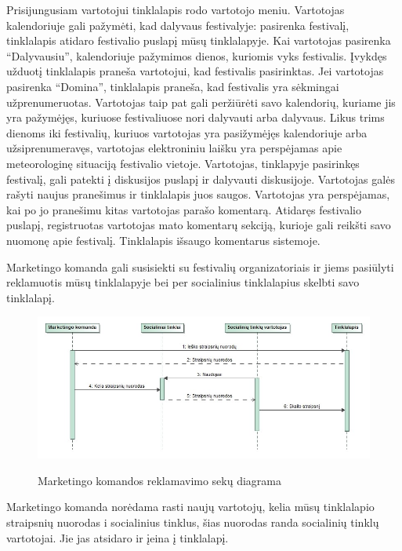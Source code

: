 \documentclass{VUMIFPSkursinis}
\begin{document}
Prisijungusiam vartotojui  tinklalapis rodo vartotojo meniu. Vartotojas kalendoriuje gali pažymėti, kad dalyvaus festivalyje: pasirenka festivalį, tinklalapis atidaro festivalio puslapį mūsų tinklalapyje. Kai vartotojas pasirenka “Dalyvausiu”, kalendoriuje pažymimos dienos, kuriomis vyks festivalis. Įvykdęs užduotį tinklalapis praneša vartotojui, kad festivalis pasirinktas. Jei vartotojas pasirenka “Domina”, tinklalapis praneša, kad festivalis yra sėkmingai užprenumeruotas. Vartotojas taip pat gali peržiūrėti savo kalendorių, kuriame jis yra pažymėjęs, kuriuose festivaliuose nori dalyvauti arba dalyvaus. Likus trims dienoms iki festivalių, kuriuos vartotojas yra pasižymėjęs kalendoriuje arba užsiprenumeravęs, vartotojas elektroniniu laišku yra perspėjamas apie meteorologinę situaciją festivalio vietoje. Vartotojas, tinklapyje pasirinkęs festivalį, gali patekti į diskusijos puslapį ir dalyvauti diskusijoje. Vartotojas galės rašyti naujus pranešimus ir tinklalapis juos saugos. Vartotojas yra perspėjamas, kai po jo pranešimu kitas vartotojas parašo komentarą. Atidaręs festivalio puslapį, registruotas vartotojas mato komentarų sekciją, kurioje gali reikšti savo nuomonę apie festivalį. Tinklalapis išsaugo komentarus sistemoje.

Marketingo komanda gali susisiekti su festivalių organizatoriais ir jiems pasiūlyti reklamuotis mūsų tinklalapyje bei per socialinius tinklalapius skelbti savo tinklalapį.

\begin{figure}[H]
    \centering
    \includegraphics[scale=0.5]{img/geri/markfacebook}
    \label{img:uml26}
	\caption{Marketingo komandos reklamavimo sekų diagrama}
\end{figure}

Marketingo komanda norėdama rasti naujų vartotojų, kelia mūsų tinklalapio straipsnių nuorodas i socialinius tinklus, šias nuorodas randa socialinių tinklų vartotojai. Jie jas atsidaro ir įeina į tinklalapį.
\end{document}
